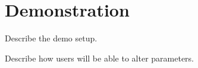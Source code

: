
\section{Demonstration}

Describe the demo setup. 

Describe how users will be able to alter parameters.
